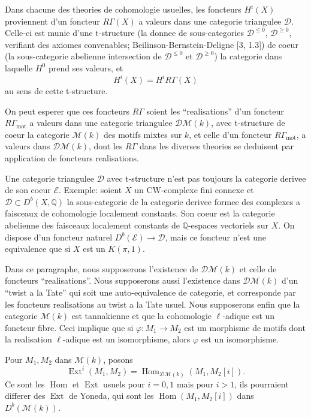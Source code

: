 \documentclass[11pt,a4paper]{article}
\theoremstyle{plain}
\theoremstyle{definition}
\DeclareMathOperator{\Ext}{Ext}
\DeclareMathOperator{\Hom}{Hom}
\newcommand{\Q}{\mathbb{Q}}
\DeclareMathOperator{\mot}{mot}
\begin{document}
Dans chacune des theories de cohomologie usuelles, les foncteurs $H^i(X)$ proviennent d'un foncteur $R\Gamma(X)$ a valeurs dans une categorie triangulee $\mathscr{D}$. Celle-ci est munie d'une t-structure (la donnee de sous-categories $\mathscr{D}^{\leq 0}$, $\mathscr{D}^{\geq 0}$, verifiant des axiomes convenables; Beilinson-Bernstein-Deligne [3, 1.3]) de coeur (la sous-categorie abelienne intersection de $\mathscr{D}^{\leq 0}$ et $\mathscr{D}^{\geq 0}$) la categorie dans laquelle $H^0$ prend ses valeurs, et
$$
H^i(X) = H^i R\Gamma(X)
$$
au sens de cette t-structure.

On peut esperer que ces foncteurs $R\Gamma$ soient les ``realisations'' d'un foncteur $R\Gamma_{\mot}$ a valeurs dans une categorie triangulee $\mathscr{D}\mathcal{M}(k)$, avec t-structure de coeur la categorie $\mathcal{M}(k)$ des motifs mixtes sur $k$, et celle d'un foncteur $R\Gamma_{\mot}$, a valeurs dans $\mathscr{D}\mathcal{M}(k)$, dont les $R\Gamma$ dans les diverses theories se deduisent par application de foncteurs realisations.

Une categorie triangulee $\mathscr{D}$ avec t-structure n'est pas toujours la categorie derivee de son coeur $\mathcal{E}$. Exemple: soient $X$ un CW-complexe fini connexe et $\mathscr{D} \subset D^b(X, \Q)$ la sous-categorie de la categorie derivee formee des complexes a faisceaux de cohomologie localement constants. Son coeur est la categorie abelienne des faisceaux localement constants de $\Q$-espaces vectoriels sur $X$. On dispose d'un foncteur naturel $D^b(\mathcal{E}) \to \mathscr{D}$, mais ce foncteur n'est une equivalence que si $X$ est un $K(\pi, 1)$.

Dans ce paragraphe, nous supposerons l'existence de $\mathscr{D}\mathcal{M}(k)$ et celle de foncteurs ``realisations''. Nous supposerons aussi l'existence dans $\mathscr{D}\mathcal{M}(k)$ d'un ``twist a la Tate'' qui soit une auto-equivalence de categorie, et corresponde par les foncteurs realisations au twist a la Tate usuel. Nous supposerons enfin que la categorie $\mathcal{M}(k)$ est tannakienne et que la cohomologie $\ell$-adique est un foncteur fibre. Ceci implique que si $\varphi: M_1 \to M_2$ est un morphisme de motifs dont la realisation $\ell$-adique est un isomorphisme, alors $\varphi$ est un isomorphisme.

Pour $M_1, M_2$ dans $\mathcal{M}(k)$, posons
$$
\Ext^i(M_1, M_2) = \Hom_{\mathscr{D}\mathcal{M}(k)}(M_1, M_2[i]).
$$
Ce sont les $\Hom$ et $\Ext$ usuels pour $i = 0, 1$ mais pour $i > 1$, ils pourraient differer des $\Ext$ de Yoneda, qui sont les $\Hom(M_1, M_2[i])$ dans $D^b(\mathcal{M}(k))$.
\end{document}

